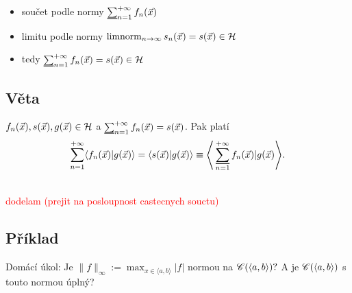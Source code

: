 \begin{itemize}
\item sou\v cet podle normy $\sumline_{n=1}^{+\infty}{f_n(\x)}$
\item limitu podle normy $\mathop{\mathrm{limnorm}}_{n \rightarrow \infty} s_n({\vec{x}})=s({\vec{x}})\in{\mathcal H}$
\item tedy $\sumline_{n=1}^{+\infty}{f_n(\x)}=s(\x)\in\H$
\end{itemize}


\subsection{V\v eta}
$f_n({\vec{x}}), s({\vec{x}}), g({\vec{x}})\in{\mathcal H} $ a $\sumline_{n=1}^{+\infty}{f_n(\x)}=s(\x)$. Pak plat\'i
\[
\sum_{n=1}^{+\infty}\la f_n(\x)|g(\x) \ra = \la s(\x)|g(\x) \ra \equiv \Bigg\langle \sumline_{n=1}^{+\infty} f_n(\x)|g(\x)\Bigg\rangle.
\] 

\Proof\\
\textcolor{red}{dodelam (prejit na posloupnost castecnych souctu)}

\subsection{P\v r\'iklad}
Domácí úkol: Je $\|f\|_\infty:=\max_{x\in\langle a,b\rangle}|f|$ normou na $\mathscr{C}(\langle a,b\rangle)?$ A je $\mathscr{C}(\langle a,b\rangle)$ s touto normou \'upln\'y?


